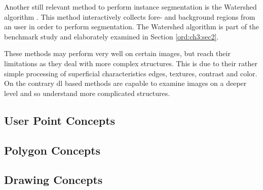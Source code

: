 Another still relevant method to perform instance segmentation is the Watershed algorithm \cite{NS94-Watershed}.
This method interactively collects fore- and background regions from an user in order to perform segmentation.
The Watershed algorithm is part of the benchmark study and elaborately examined in Section \ref{ord:ch3:sec2}.
 
These methods may perform very well on certain images, but reach their limitations as they deal with more complex structures.
This is due to their rather simple processing of superficial characteristics \eg edges, textures, contrast and color.
On the contrary \gls{dl} based methods are capable to examine images on a deeper level and so understand more complicated structures.


\subsection{User Point Concepts}\label{ord:ch2:sec3:subsec2}











\cite{Xu16-InteractiveObjectSelection}
\cite{MVL18-ITIS}
\cite{Maj20-One-Click}
\cite{Hu19-TwoStreamFusionNetwork}
\cite{Liew17-RegionalInteractiveImageSeg}
\cite{JG18-ClickCarving}



\cite{Man18-DEXTR}
\cite{Zha20-IOG}

\subsection{Polygon Concepts}\label{ord:ch2:sec3:subsec3}
\cite{Acu18-Polygon-RNN++}
\cite{Ling19-Curve-GCN} 

\subsection{Drawing Concepts}\label{ord:ch2:sec3:subsec4}
